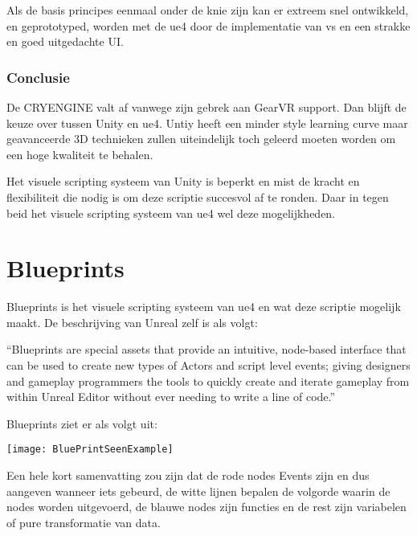 Als de basis principes eenmaal onder de knie zijn kan er extreem snel ontwikkeld, en geprototyped, worden met de \gls{ue4} door de implementatie van \gls{vs} en een strakke en goed uitgedachte UI.

\subsubsection{Conclusie}
De CRYENGINE valt af vanwege zijn gebrek aan GearVR support. Dan blijft de keuze over tussen Unity en \gls{ue4}. Untiy heeft een minder style learning curve maar geavanceerde 3D technieken zullen uiteindelijk toch geleerd moeten worden om een hoge kwaliteit te behalen. 

Het visuele scripting systeem van Unity is beperkt en mist de kracht en flexibiliteit die nodig is om deze scriptie succesvol af te ronden. Daar in tegen beid het visuele scripting systeem van \gls{ue4} wel deze mogelijkheden.

\section{Blueprints}
Blueprints is het visuele scripting systeem van \gls{ue4} en wat deze scriptie mogelijk maakt. De beschrijving van Unreal zelf is als volgt:

“Blueprints are special assets that provide an intuitive, node-based interface that can be used to create new types of Actors and script level events; giving designers and gameplay programmers the tools to quickly create and iterate gameplay from within Unreal Editor without ever needing to write a line of code.”

Blueprints ziet er als volgt uit:

\texttt{[image: BluePrintSeenExample]}

Een hele kort samenvatting zou zijn dat de rode nodes Events zijn en dus aangeven wanneer iets gebeurd, de witte lijnen bepalen de volgorde waarin de nodes worden uitgevoerd, de blauwe nodes zijn functies en de rest zijn variabelen of pure transformatie van data.